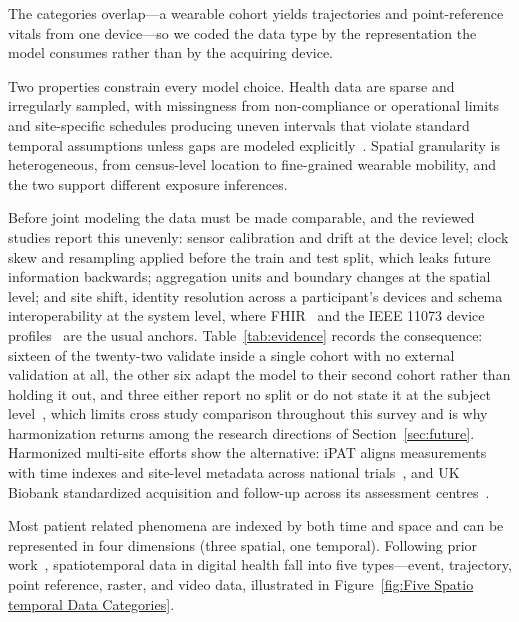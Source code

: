 \documentclass[journal]{IEEEtran}
\newif\ifsubmission
\begin{document}
The categories overlap---a wearable cohort yields trajectories and point-reference vitals from one device---so we coded the data type by the representation the model consumes rather than by the acquiring device.

Two properties constrain every model choice. Health data are sparse and irregularly sampled, with missingness from non-compliance or operational limits~\cite{che2018grud} and site-specific schedules producing uneven intervals that violate standard temporal assumptions unless gaps are modeled explicitly~\cite{shukla2021irregular}. Spatial granularity is heterogeneous, from census-level location to fine-grained wearable mobility, and the two support different exposure inferences.

Before joint modeling the data must be made comparable, and the reviewed studies report this unevenly: sensor calibration and drift at the device level; clock skew and resampling applied before the train and test split, which leaks future information backwards; aggregation units and boundary changes at the spatial level; and site shift, identity resolution across a participant's devices and schema interoperability at the system level, where FHIR~\cite{ayaz2021fhir} and the IEEE 11073 device profiles~\cite{ieee11073std} are the usual anchors. Table~\ref{tab:evidence} records the consequence: sixteen of the twenty-two validate inside a single cohort with no external validation at all, the other six adapt the model to their second cohort rather than holding it out, and three either report no split or do not state it at the subject level~\cite{XiaoLi2016DiabetesSpatiotemporal,zhu2024ippg,liu2025sleepposture}, which limits cross study comparison throughout this survey and is why harmonization returns among the research directions of Section~\ref{sec:future}. Harmonized multi-site efforts show the alternative: iPAT aligns measurements with time indexes and site-level metadata across national trials~\cite{Fang2021iPAT}, and UK Biobank standardized acquisition and follow-up across its assessment centres~\cite{sudlow2015ukbiobank}.
\else

Most patient related phenomena are indexed by both time and space and can be represented in four dimensions (three spatial, one temporal). Following prior work~\cite{wang2022deep,atluri2018stdm}, spatiotemporal data in digital health fall into five types---event, trajectory, point reference, raster, and video data\ifsubmission\else , illustrated in Figure~\ref{fig:Five Spatio temporal Data Categories}\fi .
\end{document}
